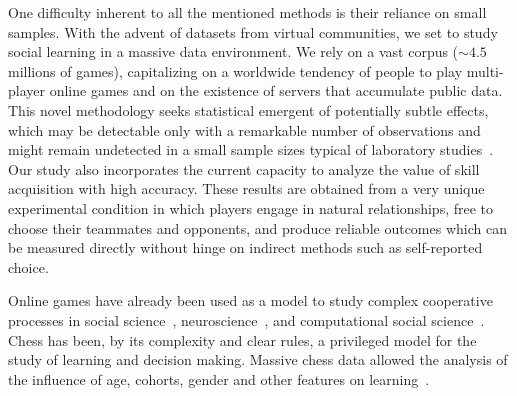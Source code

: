 \documentclass[a4paper,10pt]{book}
\theoremstyle{definition}
\begin{document}
One difficulty inherent to all the mentioned methods is their reliance on small samples.
With the advent of datasets from virtual communities, we set to study social learning in a massive data environment.
We rely on a vast corpus ($\sim4.5$ millions of games), capitalizing on a worldwide tendency of people to play multi-player online games and on the existence of servers that accumulate public data.
This novel methodology seeks statistical emergent of potentially subtle effects, which may be detectable only with a remarkable number of observations and might remain undetected in a small sample sizes typical of laboratory studies~\cite{slezak2012-doNotFearYourOpponent}.
Our study also incorporates the current capacity to analyze the value of skill acquisition with high accuracy.
These results are obtained from a very unique experimental condition in which players engage in natural relationships, free to choose their teammates and opponents, and produce reliable outcomes which can be measured directly without hinge on indirect methods such as self-reported choice.

Online games have already been used as a model to study complex cooperative processes in social science~\cite{beheim2014-strategicSocialLearning,Johnson2009-onlineGuildsOfflineGangs}, neuroscience~\cite{slezak2012-doNotFearYourOpponent,sigman2010-chess}, and computational social science~\cite{delong2013-phd_teamChemistry,roy2013-socializationAndTrustFormation,borbora2012-churnPredictionOnlineGames,shim2010-teamPerformancePrediction}.  
Chess has been, by its complexity and clear rules, a privileged model for the study of learning and decision making.
Massive chess data allowed the analysis of the influence of age, cohorts, gender and other features on learning~\cite{chabris_glickman2006-sexDifferencesChessPerformance,roring2007-expertiseInChessAcrossLifeSpan,stafford2014-skillLearningOnlineGame,howard2014-learningCurvesChessPlayersATestOfPowerLawGenerality,gaschler2014-playingOffThePredictedLearningCurve,vaci2016-chessDatabasesAgePerformance}.
\end{document}
